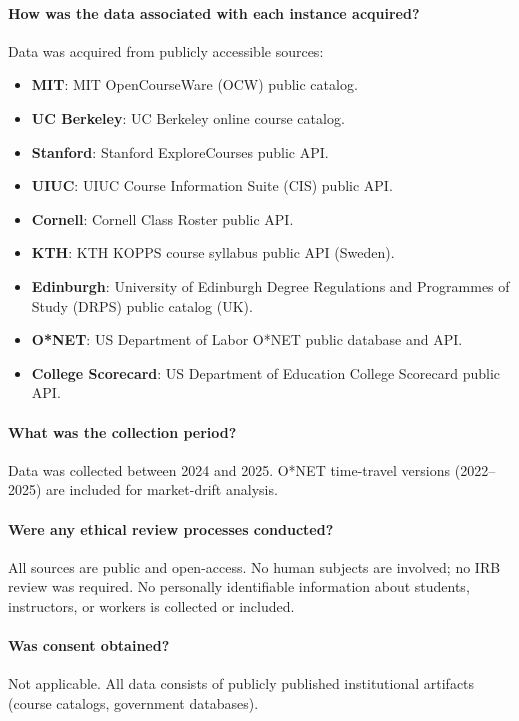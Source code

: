 \paragraph{How was the data associated with each instance acquired?}
Data was acquired from publicly accessible sources:
\begin{itemize}
  \item \textbf{MIT}: MIT OpenCourseWare (OCW) public catalog.
  \item \textbf{UC Berkeley}: UC Berkeley online course catalog.
  \item \textbf{Stanford}: Stanford ExploreCourses public API.
  \item \textbf{UIUC}: UIUC Course Information Suite (CIS) public API.
  \item \textbf{Cornell}: Cornell Class Roster public API.
  \item \textbf{KTH}: KTH KOPPS course syllabus public API (Sweden).
  \item \textbf{Edinburgh}: University of Edinburgh Degree Regulations and Programmes of Study (DRPS) public catalog (UK).
  \item \textbf{O*NET}: US Department of Labor O*NET public database and API.
  \item \textbf{College Scorecard}: US Department of Education College Scorecard public API.
\end{itemize}

\paragraph{What was the collection period?}
Data was collected between 2024 and 2025. O*NET time-travel versions (2022--2025) are included for market-drift analysis.

\paragraph{Were any ethical review processes conducted?}
All sources are public and open-access. No human subjects are involved; no IRB review was required. No personally identifiable information about students, instructors, or workers is collected or included.

\paragraph{Was consent obtained?}
Not applicable. All data consists of publicly published institutional artifacts (course catalogs, government databases).

